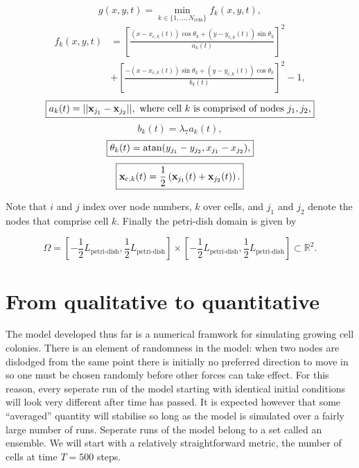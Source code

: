 \begin{equation}
    \boxed{
    g(x,y,t) = \min_{k \in \{  1, ..., N_{\textrm{cells}}\}} f_k (x,y,t),
    }
\end{equation}
\begin{equation}
    \boxed{
    \begin{split}
    f_k(x,y,t) &= \left[\frac{ (x-x_{c,k}(t))\cos{\theta_k} + (y-y_{c,k}(t)) \sin{\theta_k}}{a_k(t)} \right]^2 \\ 
               &+ \left[ \frac{-(x-x_{c,k}(t))\sin{\theta_k} +(y-y_{c,k}(t)) \cos{\theta_k}}{b_k(t)} \right]^2 - 1,
    \end{split}
    }
\end{equation}
\begin{equation} \label{eqn:EOMs_growth_rate}
    \boxed{a_k(t) = ||\vb{x}_{j_1} - \vb{x}_{j_2}||, \ 
    \textrm{where cell} \ k \ \textrm{is comprised of nodes} \ j_1, j_2,} 
\end{equation}
\begin{equation} \label{eqn:EOMs_growth_rate}
    \boxed{b_k(t) = \lambda_7 a_k(t), }
\end{equation}
\begin{equation} \label{eqn:EOMs_growth_rate}
    \boxed{\theta_k(t) = \atan (y_{j_1} - y_{j_2},x_{j_1} - x_{j_2} ), }
\end{equation}
\begin{equation} \label{eqn:EOMs_ODEs_initial}
    \boxed{ \vb{x}_{c,k}(t) = \frac{1}{2} \left(\vb{x}_{j_1}(t) + \vb{x}_{j_2}(t)\right). }
\end{equation}

Note that $i$ and $j$ index over node numbers, $k$ over cells, and $j_1$ and $j_2$ denote the nodes
that comprise cell $k$. Finally the petri-dish domain is given by 

\begin{equation}
    \boxed{\Omega = \left[-\frac{1}{2}L_{\textrm{petri-dish}},\frac{1}{2}L_{\textrm{petri-dish}} \right] \times
             \left[-\frac{1}{2}L_{\textrm{petri-dish}},\frac{1}{2}L_{\textrm{petri-dish}} \right] \subset \mathbb{R}^2.}
\end{equation}

\section{From qualitative to quantitative}
The model developed thus far is a numerical framwork for simulating growing cell colonies.
There is an element of randomness in the model: when two nodes are dislodged from the 
same point there is initially no preferred direction to move in so one must be chosen randomly
before other forces can take effect. For this reason, every seperate run of the model 
starting with identical initial conditions will look very different after time has passed. 
It is expected however that some ``averaged''
quantity will stabilise so long as the model is simulated over a fairly large number of runs.
Seperate runs of the model belong to a set called an ensemble.
We will start with a relatively straightforward metric, the number of cells at time
$T = 500$ steps.

